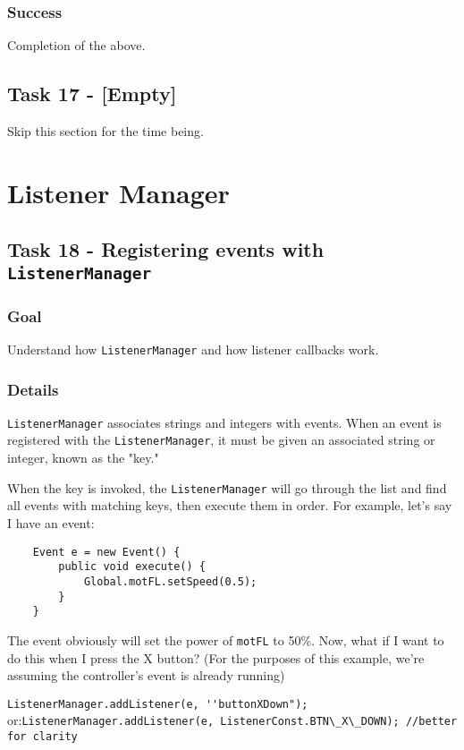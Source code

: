 \documentclass[a4paper]{article}
\begin{document}
\subsubsection{Success} Completion of the above.

\subsection{Task 17 - [Empty]} Skip this section for the time being.


\section{Listener Manager}\setcounter{subsection}{17}

\subsection{Task 18 - Registering events with \lstinline{ListenerManager}}
\subsubsection{Goal} Understand how \lstinline{ListenerManager} and how listener callbacks work.
\subsubsection{Details} \lstinline{ListenerManager} associates strings and integers with events. When an event is registered with the \lstinline{ListenerManager}, it must be given an associated string or integer, known as the "key." 

When the key is invoked, the \lstinline{ListenerManager} will go through the list and find all events with matching keys, then execute them in order. For example, let's say I have an event:

\begin{verbatim}
	Event e = new Event() {
		public void execute() {
			Global.motFL.setSpeed(0.5);
		}
	}
\end{verbatim}

The event obviously will set the power of \lstinline{motFL} to 50\%. Now, what if I want to do this when I press the X button? (For the purposes of this example, we're assuming the controller's event is already running)

\lstinline{ListenerManager.addListener(e, ''buttonXDown");} or:\newline\indent\lstinline{ListenerManager.addListener(e, ListenerConst.BTN\_X\_DOWN); //better for clarity}
\end{document}
